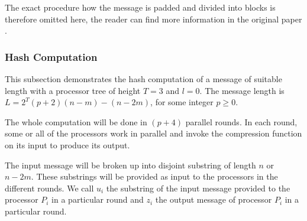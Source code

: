 \documentclass[letterpaper]{article}
\begin{document}
The exact procedure how the message is padded and divided into blocks is therefore omitted here, the reader can find more information in the original paper \cite{parsha256}.


\subsubsection{Hash Computation}\label{parsha-hash}
This subsection demonstrates the hash computation of a message of suitable length with a processor tree of height $T = 3$ and $l = 0$. The message length is $L = 2^T(p+2)(n-m)-(n-2m)$, for some integer $p \geq 0$.


The whole computation will be done in $(p+4)$ parallel rounds. In each round, some or all of the processors work in parallel and invoke the compression function on its input to produce its output.

The input message will be broken up into disjoint substring of length $n$ or $n-2m$. These substrings will be provided as input to the processors in the different rounds. We call $u_i$ the substring of the input message provided to the processor $P_i$ in a particular round and $z_i$ the output message of processor $P_i$ in a particular round.
\end{document}
